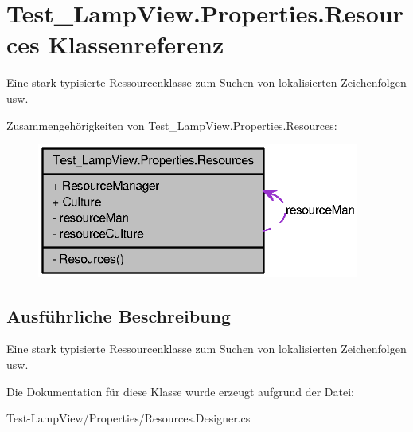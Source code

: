 \hypertarget{class_test___lamp_view_1_1_properties_1_1_resources}{
\section{Test\_\-LampView.Properties.Resources Klassenreferenz}
\label{class_test___lamp_view_1_1_properties_1_1_resources}
}


Eine stark typisierte Ressourcenklasse zum Suchen von lokalisierten Zeichenfolgen usw.  




Zusammengehörigkeiten von Test\_\-LampView.Properties.Resources:\nopagebreak
\begin{figure}[H]
\begin{center}
\leavevmode
\includegraphics[width=301pt]{class_test___lamp_view_1_1_properties_1_1_resources__coll__graph}
\end{center}
\end{figure}


\subsection{Ausführliche Beschreibung}
Eine stark typisierte Ressourcenklasse zum Suchen von lokalisierten Zeichenfolgen usw. 

Die Dokumentation für diese Klasse wurde erzeugt aufgrund der Datei:\begin{DoxyCompactItemize}
\item 
Test-\/LampView/Properties/Resources.Designer.cs\end{DoxyCompactItemize}
